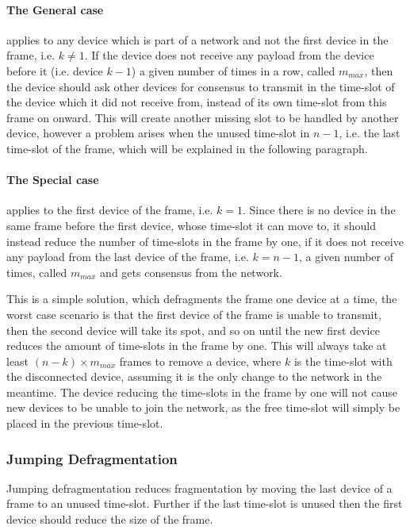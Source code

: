 \paragraph{The General case}applies to any device which is part of a network and not the first device in the frame, i.e. $k \neq 1$.
If the device does not receive any payload from the device before it (i.e. device $k - 1$) a given number of times in a row, called $m_{max}$, then the device should ask other devices for consensus to transmit in the time-slot of the device which it did not receive from, instead of its own time-slot from this frame on onward. 
This will create another missing slot to be handled by another device, however a problem arises when the unused time-slot in $n - 1$, i.e. the last time-slot of the frame, which will be explained in the following paragraph.

\paragraph{The Special case}applies to the first device of the frame, i.e. $k = 1$. 
Since there is no device in the same frame before the first device, whose time-slot it can move to, it should instead reduce the number of time-slots in the frame by one, if it does not receive any payload from the last device of the frame, i.e. $k = n - 1$, a given number of times, called $m_{max}$ and gets consensus from the network. 


\bigskip

This is a simple solution, which defragments the frame one device at a time, the worst case scenario is that the first device of the frame is unable to transmit, then the second device will take its spot, and so on until the new first device reduces the amount of time-slots in the frame by one. 
This will always take at least $(n - k) \times m_{max}$ frames to remove a device, where $k$ is the time-slot with the disconnected device, assuming it is the only change to the network in the meantime. 
The device reducing the time-slots in the frame by one will not cause new devices to be unable to join the network, as the free time-slot will simply be placed in the previous time-slot. 

\subsubsection{Jumping Defragmentation}
Jumping defragmentation reduces fragmentation by moving the last device of a frame to an unused time-slot. Further if the last time-slot is unused then the first device should reduce the size of the frame.

